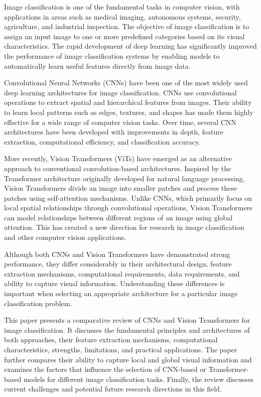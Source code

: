 \documentclass[conference]{IEEEtran}
\begin{document}
Image classification is one of the fundamental tasks in computer vision, with applications in areas such as medical imaging, autonomous systems, security, agriculture, and industrial inspection. The objective of image classification is to assign an input image to one or more predefined categories based on its visual characteristics. The rapid development of deep learning has significantly improved the performance of image classification systems by enabling models to automatically learn useful features directly from image data.

Convolutional Neural Networks (CNNs) have been one of the most widely used deep learning architectures for image classification. CNNs use convolutional operations to extract spatial and hierarchical features from images. Their ability to learn local patterns such as edges, textures, and shapes has made them highly effective for a wide range of computer vision tasks. Over time, several CNN architectures have been developed with improvements in depth, feature extraction, computational efficiency, and classification accuracy.

More recently, Vision Transformers (ViTs) have emerged as an alternative approach to conventional convolution-based architectures. Inspired by the Transformer architecture originally developed for natural language processing, Vision Transformers divide an image into smaller patches and process these patches using self-attention mechanisms. Unlike CNNs, which primarily focus on local spatial relationships through convolutional operations, Vision Transformers can model relationships between different regions of an image using global attention. This has created a new direction for research in image classification and other computer vision applications.

Although both CNNs and Vision Transformers have demonstrated strong performance, they differ considerably in their architectural design, feature extraction mechanisms, computational requirements, data requirements, and ability to capture visual information. Understanding these differences is important when selecting an appropriate architecture for a particular image classification problem.

This paper presents a comparative review of CNNs and Vision Transformers for image classification. It discusses the fundamental principles and architectures of both approaches, their feature extraction mechanisms, computational characteristics, strengths, limitations, and practical applications. The paper further compares their ability to capture local and global visual information and examines the factors that influence the selection of CNN-based or Transformer-based models for different image classification tasks. Finally, the review discusses current challenges and potential future research directions in this field.
\end{document}
